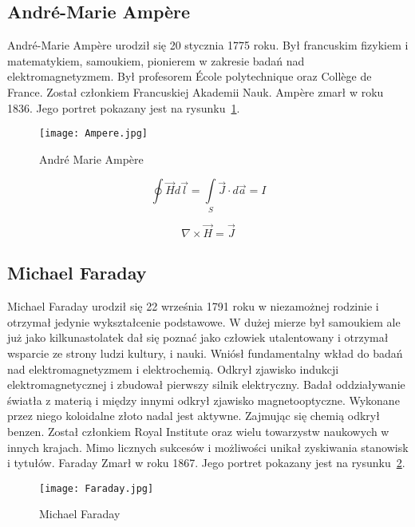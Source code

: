\subsection{André-Marie Ampère}
André-Marie Ampère urodził się 20 stycznia 1775 roku. Był francuskim fizykiem i matematykiem, samoukiem, pionierem w zakresie badań nad elektromagnetyzmem. Był profesorem École polytechnique oraz Collège de France. Został członkiem Francuskiej Akademii Nauk. Ampère zmarł w roku 1836. Jego portret pokazany jest na rysunku~\ref{rys:ampere}.

\begin{figure}[!hb]
	\centering \texttt{[image: Ampere.jpg]}
	\caption{André Marie Ampère}
	\label{rys:ampere}
\end{figure}

\begin{equation}
    \oint \vec{H} d\vec{l} = \int\limits_{S} \vec{J} \cdot d \vec{a} = I
\end{equation}

\begin{equation}
    \nabla \times \vec{H} = \vec{J}
\end{equation}

\subsection{Michael Faraday}
Michael Faraday urodził się 22 września 1791 roku w niezamożnej rodzinie i otrzymał jedynie wykształcenie podstawowe. W dużej mierze był samoukiem ale już jako kilkunastolatek dał się poznać jako człowiek utalentowany i otrzymał wsparcie ze strony ludzi kultury, i nauki. Wniósł fundamentalny wkład do badań nad elektromagnetyzmem i elektrochemią. Odkrył zjawisko indukcji elektromagnetycznej i zbudował pierwszy silnik elektryczny. Badał oddziaływanie światła z materią i między innymi odkrył zjawisko magnetooptyczne. Wykonane przez niego koloidalne złoto nadal jest aktywne. Zajmując się chemią odkrył benzen. Został członkiem Royal Institute oraz wielu towarzystw naukowych w innych krajach. Mimo licznych sukcesów i możliwości unikał zyskiwania stanowisk i tytułów. Faraday Zmarł w roku 1867. Jego portret pokazany jest na rysunku~\ref{rys:faraday}.

\begin{figure}[!hb]
	\centering \texttt{[image: Faraday.jpg]}
	\caption{Michael Faraday}
	\label{rys:faraday}
\end{figure}


